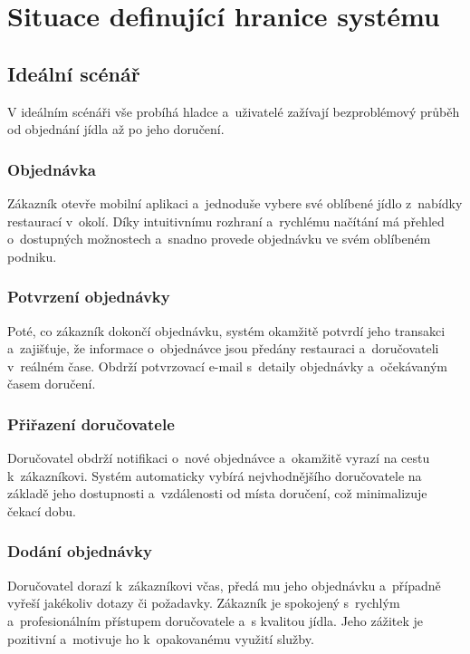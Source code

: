 \section{Situace definující hranice systému}

	\subsection{Ideální scénář}

	V ideálním scénáři vše probíhá hladce a~uživatelé zažívají bezproblémový průběh od objednání jídla až po jeho doručení.

    	\subsubsection{Objednávka} 

		Zákazník otevře mobilní aplikaci a~jednoduše vybere své oblíbené jídlo z~nabídky restaurací v~okolí. Díky intuitivnímu rozhraní a~rychlému načítání má přehled o~dostupných možnostech a~snadno provede objednávku ve svém oblíbeném podniku.

    	\subsubsection{Potvrzení objednávky} 

		Poté, co zákazník dokončí objednávku, systém okamžitě potvrdí jeho transakci a~zajišťuje, že informace o~objednávce jsou předány restauraci a~doručovateli v~reálném čase. Obdrží potvrzovací e-mail s~detaily objednávky a~očekávaným časem doručení.

    	\subsubsection{Přiřazení doručovatele} 

		Doručovatel obdrží notifikaci o~nové objednávce a~okamžitě vyrazí na cestu k~zákazníkovi. Systém automaticky vybírá nejvhodnějšího doručovatele na základě jeho dostupnosti a~vzdálenosti od místa doručení, což minimalizuje čekací dobu.

    	\subsubsection{Dodání objednávky} 

		Doručovatel dorazí k~zákazníkovi včas, předá mu jeho objednávku a~případně vyřeší jakékoliv dotazy či požadavky. Zákazník je spokojený s~rychlým a~profesionálním přístupem doručovatele a~s kvalitou jídla. Jeho zážitek je pozitivní a~motivuje ho k~opakovanému využití služby.
	
